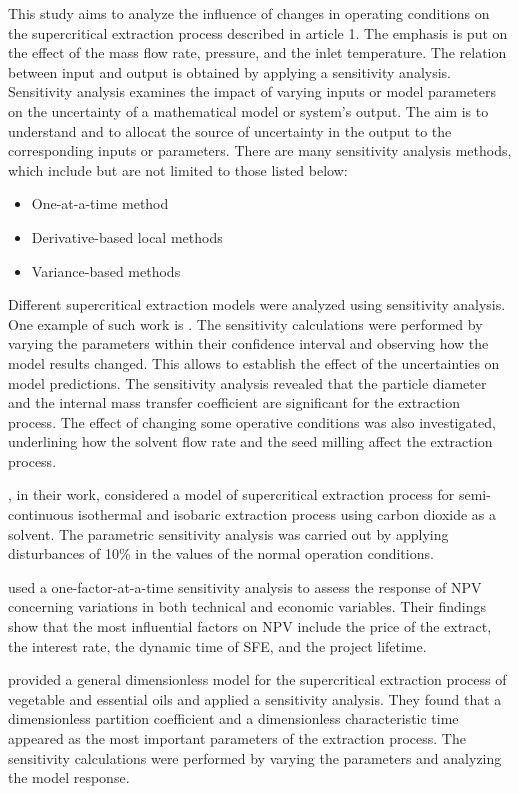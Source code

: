 \documentclass[../Article_Model_Parameters.tex]{subfiles}
\begin{document}
	
	This study aims to analyze the influence of changes in operating conditions on the supercritical extraction process described in {\color{red}article 1}. The emphasis is put on the effect of the mass flow rate, pressure, and the inlet temperature. The relation between input and output is obtained by applying a sensitivity analysis. Sensitivity analysis examines the impact of varying inputs or model parameters on the uncertainty of a mathematical model or system's output. The aim is to understand and to allocat the source of uncertainty in the output to the corresponding inputs or parameters. There are many sensitivity analysis methods, which include but are not limited to those listed below:
	
	\begin{itemize}
		\item One-at-a-time method
		\item Derivative-based local methods
		\item Variance-based methods
	\end{itemize}
	
	Different supercritical extraction models were analyzed using sensitivity analysis. One example of such work is \citet{Fiori_2007}. The sensitivity calculations were performed by varying the parameters within their confidence interval and observing how the model results changed. This allows to establish the effect of the uncertainties on model predictions. The sensitivity analysis revealed that the particle diameter and the internal mass transfer coefficient are significant for the extraction process. The effect of changing some operative conditions was also investigated, underlining how the solvent flow rate and the seed milling affect the extraction process.
	
	\citet{Santos2000}, in their work, considered a model of supercritical extraction process for semi-continuous isothermal and isobaric extraction process using carbon dioxide as a solvent. The parametric sensitivity analysis was carried out by applying disturbances of 10\% in the values of the normal operation conditions.
	
	\citet{Hatami2024} used a one-factor-at-a-time sensitivity analysis to assess the response of NPV concerning variations in both technical and economic variables. Their findings show that the most influential factors on NPV include the price of the extract, the interest rate, the dynamic time of SFE, and the project lifetime.
	
	\citet{Poletto1996} provided a general dimensionless model for the supercritical extraction process of vegetable and essential oils and applied a sensitivity analysis. They found that a dimensionless partition coefficient and a dimensionless characteristic time appeared as the most important parameters of the extraction process. The sensitivity calculations were performed by varying the parameters and analyzing the model response.
	
\end{document}
